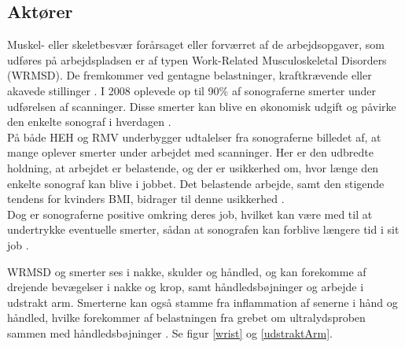 \subsection{Aktører} \label{aktoerer_organisation}
Muskel- eller skeletbesvær forårsaget eller forværret af de arbejdsopgaver, som udføres på arbejdspladsen er af typen Work-Related Musculoskeletal Disorders (WRMSD). De fremkommer ved gentagne belastninger, kraftkrævende eller akavede stillinger \cite{24}. I 2008 oplevede op til 90\% af sonograferne smerter under udførelsen af scanninger. Disse smerter kan blive en økonomisk udgift og påvirke den enkelte sonograf i hverdagen \cite{24}\cite{30}\cite{31}\cite{36}.\\
På både HEH og RMV underbygger udtalelser fra sonograferne billedet af, at mange oplever smerter under arbejdet med scanninger. 
Her er den udbredte holdning, at arbejdet er belastende, og der er usikkerhed om, hvor længe den enkelte sonograf kan blive i jobbet. Det belastende arbejde, samt den stigende tendens for kvinders BMI, bidrager til denne usikkerhed \cite{kvinderovervaegt}\cite{24}\cite{31}. \\
Dog er sonograferne positive omkring deres job, hvilket kan være med til at undertrykke eventuelle smerter, sådan at sonografen kan forblive længere tid i sit job \cite{1}\cite{24}.

WRMSD og smerter ses i nakke, skulder og håndled, og kan forekomme af drejende bevægelser i nakke og krop, samt håndledsbøjninger og arbejde i udstrakt arm. Smerterne kan også stamme fra inflammation af senerne i hånd og håndled, hvilke forekommer af belastningen fra grebet om ultralydsproben sammen med håndledsbøjninger \cite{1}\cite{24}\cite{31}\cite{32}\cite{36}. Se figur \ref{wrist} og \ref{udstraktArm}.

